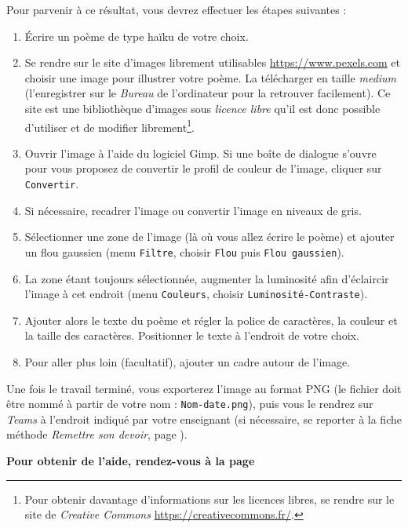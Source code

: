 {Pour parvenir à ce résultat, vous devrez effectuer les étapes suivantes :
\begin{enumerate}
\item Écrire un poème de type haïku de votre choix.
\item Se rendre sur le site d'images librement utilisables \url{https://www.pexels.com} et choisir une image pour illustrer votre poème. La télécharger en taille \emph{medium} (l'enregistrer sur le \emph{Bureau} de l'ordinateur pour la retrouver facilement). Ce site est une bibliothèque d'images sous \emph{licence libre} qu'il est donc possible d'utiliser et de modifier librement\footnote{Pour obtenir davantage d'informations sur les licences libres, se rendre sur le site de \emph{Creative Commons} \url{https://creativecommons.fr/}.}.
\item Ouvrir l'image à l'aide du logiciel Gimp. Si une boîte de dialogue s'ouvre pour vous proposez de convertir le profil de couleur de l'image, cliquer sur \texttt{Convertir}.
\item Si nécessaire, recadrer l'image ou convertir l'image en niveaux de gris.
\item Sélectionner une zone de l'image (là où vous allez écrire le poème) et ajouter un flou gaussien (menu \texttt{Filtre}, choisir \texttt{Flou} puis \texttt{Flou gaussien}).   
\item La zone étant toujours sélectionnée, augmenter la luminosité afin d'éclaircir l'image à cet endroit (menu \texttt{Couleurs}, choisir \texttt{Luminosité-Contraste}). 
\item Ajouter alors le texte du poème et régler la police de caractères, la couleur et la taille des caractères. Positionner le texte à l'endroit de votre choix.
\item Pour aller plus loin (facultatif), ajouter un cadre autour de l'image.
\end{enumerate}
Une fois le travail terminé, vous exporterez l'image au format PNG (le fichier doit être nommé à partir de votre nom : \texttt{Nom-date.png}), puis vous le rendrez sur \emph{Teams} à l'endroit indiqué par votre enseignant (si nécessaire, se reporter à la fiche méthode \emph{Remettre son devoir}, page \pageref{TeamsRemettreDevoir}).}

\textbf{Pour obtenir de l'aide, rendez-vous à la page \pageref{Image5eOutils}}




